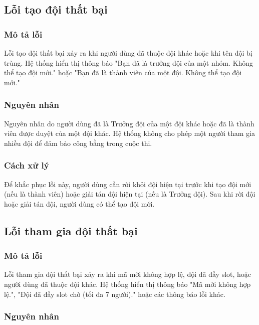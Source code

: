 \subsection{Lỗi tạo đội thất bại}

\subsubsection{Mô tả lỗi}

Lỗi tạo đội thất bại xảy ra khi người dùng đã thuộc đội khác hoặc khi tên đội bị trùng. Hệ thống hiển thị thông báo "Bạn đã là trưởng đội của một nhóm. Không thể tạo đội mới." hoặc "Bạn đã là thành viên của một đội. Không thể tạo đội mới."

\subsubsection{Nguyên nhân}

Nguyên nhân do người dùng đã là Trưởng đội của một đội khác hoặc đã là thành viên được duyệt của một đội khác. Hệ thống không cho phép một người tham gia nhiều đội để đảm bảo công bằng trong cuộc thi.

\subsubsection{Cách xử lý}

Để khắc phục lỗi này, người dùng cần rời khỏi đội hiện tại trước khi tạo đội mới (nếu là thành viên) hoặc giải tán đội hiện tại (nếu là Trưởng đội). Sau khi rời đội hoặc giải tán đội, người dùng có thể tạo đội mới.

\subsection{Lỗi tham gia đội thất bại}

\subsubsection{Mô tả lỗi}

Lỗi tham gia đội thất bại xảy ra khi mã mời không hợp lệ, đội đã đầy slot, hoặc người dùng đã thuộc đội khác. Hệ thống hiển thị thông báo "Mã mời không hợp lệ.", "Đội đã đầy slot chờ (tối đa 7 người)." hoặc các thông báo lỗi khác.

\subsubsection{Nguyên nhân}

